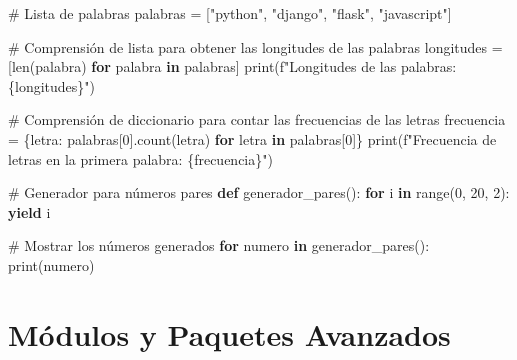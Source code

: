 \documentclass[
  a4paper,
  DIV=11,
  numbers=noendperiod,
  onepage,
  openany]{scrreprt}
\newenvironment{Shaded}{\begin{snugshade}}{\end{snugshade}}
\newcommand{\BuiltInTok}[1]{\textcolor[rgb]{0.00,0.23,0.31}{#1}}
\newcommand{\CommentTok}[1]{\textcolor[rgb]{0.37,0.37,0.37}{#1}}
\newcommand{\ControlFlowTok}[1]{\textcolor[rgb]{0.00,0.23,0.31}{\textbf{#1}}}
\newcommand{\DecValTok}[1]{\textcolor[rgb]{0.68,0.00,0.00}{#1}}
\newcommand{\KeywordTok}[1]{\textcolor[rgb]{0.00,0.23,0.31}{\textbf{#1}}}
\newcommand{\NormalTok}[1]{\textcolor[rgb]{0.00,0.23,0.31}{#1}}
\newcommand{\OperatorTok}[1]{\textcolor[rgb]{0.37,0.37,0.37}{#1}}
\newcommand{\SpecialCharTok}[1]{\textcolor[rgb]{0.37,0.37,0.37}{#1}}
\newcommand{\SpecialStringTok}[1]{\textcolor[rgb]{0.13,0.47,0.30}{#1}}
\newcommand{\StringTok}[1]{\textcolor[rgb]{0.13,0.47,0.30}{#1}}
\begin{document}
\begin{Shaded}
\begin{Highlighting}[]
\CommentTok{\# Lista de palabras}
\NormalTok{palabras }\OperatorTok{=}\NormalTok{ [}\StringTok{"python"}\NormalTok{, }\StringTok{"django"}\NormalTok{, }\StringTok{"flask"}\NormalTok{, }\StringTok{"javascript"}\NormalTok{]}

\CommentTok{\# Comprensión de lista para obtener las longitudes de las palabras}
\NormalTok{longitudes }\OperatorTok{=}\NormalTok{ [}\BuiltInTok{len}\NormalTok{(palabra) }\ControlFlowTok{for}\NormalTok{ palabra }\KeywordTok{in}\NormalTok{ palabras]}
\BuiltInTok{print}\NormalTok{(}\SpecialStringTok{f"Longitudes de las palabras: }\SpecialCharTok{\{}\NormalTok{longitudes}\SpecialCharTok{\}}\SpecialStringTok{"}\NormalTok{)}

\CommentTok{\# Comprensión de diccionario para contar las frecuencias de las letras}
\NormalTok{frecuencia }\OperatorTok{=}\NormalTok{ \{letra: palabras[}\DecValTok{0}\NormalTok{].count(letra) }\ControlFlowTok{for}\NormalTok{ letra }\KeywordTok{in}\NormalTok{ palabras[}\DecValTok{0}\NormalTok{]\}}
\BuiltInTok{print}\NormalTok{(}\SpecialStringTok{f"Frecuencia de letras en la primera palabra: }\SpecialCharTok{\{}\NormalTok{frecuencia}\SpecialCharTok{\}}\SpecialStringTok{"}\NormalTok{)}

\CommentTok{\# Generador para números pares}
\KeywordTok{def}\NormalTok{ generador\_pares():}
    \ControlFlowTok{for}\NormalTok{ i }\KeywordTok{in} \BuiltInTok{range}\NormalTok{(}\DecValTok{0}\NormalTok{, }\DecValTok{20}\NormalTok{, }\DecValTok{2}\NormalTok{):}
        \ControlFlowTok{yield}\NormalTok{ i}

\CommentTok{\# Mostrar los números generados}
\ControlFlowTok{for}\NormalTok{ numero }\KeywordTok{in}\NormalTok{ generador\_pares():}
    \BuiltInTok{print}\NormalTok{(numero)}
\end{Highlighting}
\end{Shaded}

\chapter{Módulos y Paquetes
Avanzados}\label{muxf3dulos-y-paquetes-avanzados}
\end{document}
